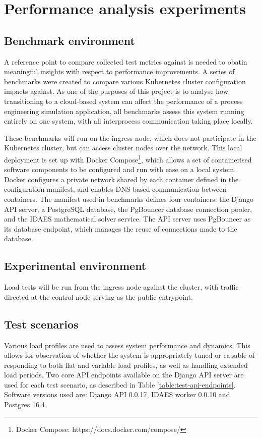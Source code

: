 \section{Performance analysis experiments}
\subsection{Benchmark environment}

A reference point to compare collected test metrics against is needed to obatin meaningful insights with respect to performance improvements. A series of benchmarks were created to compare various Kubernetes cluster configuration impacts against. As one of the purposes of this project is to analyse how transitioning to a cloud-based system can affect the performance of a process engineering simulation application, all benchmarks assess this system running entirely on one system, with all interprocess communication taking place locally.

These benchmarks will run on the ingress node, which does not participate in the Kubernetes cluster, but can access cluster nodes over the network. This local deployment is set up with Docker Compose\footnote{Docker Compose: https://docs.docker.com/compose/}, which allows a set of containerised software components to be configured and run with ease on a local system. Docker configures a private network shared by each container defined in the configuration manifest, and enables DNS-based communication between containers. The manifest used in benchmarks defines four containers: the Django API server, a PostgreSQL database, the PgBouncer database connection pooler, and the IDAES mathematical solver service. The API server uses PgBouncer as its database endpoint, which manages the reuse of connections made to the database. 

\subsection{Experimental environment}

Load tests will be run from the ingress node against the cluster, with traffic directed at the control node serving as the public entrypoint.

\subsection{Test scenarios}

Various load profiles are used to assess system performance and dynamics. This allows for observation of whether the system is appropriately tuned or capable of responding to both flat and variable load profiles, as well as handling extended load periods. Two core API endpoints available on the Django API server are used for each test scenario, as described in Table \ref{table:test-api-endpoints}. Software versions used are: Django API 0.0.17, IDAES worker 0.0.10 and Postgres 16.4.

